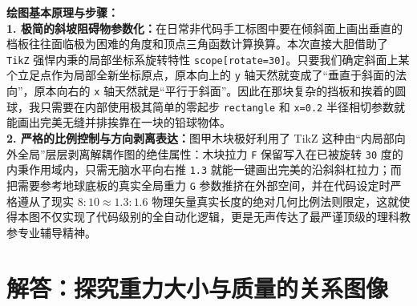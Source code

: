 \documentclass[12pt, a4paper]{ctexrep}
\begin{document}
{\small\color{blue!70!black}
\textbf{绘图基本原理与步骤：}\\
\textbf{1. 极简的斜坡阻碍物参数化：}在日常非代码手工标图中要在倾斜面上画出垂直的档板往往面临极为困难的角度和顶点三角函数计算换算。本次直接大胆借助了 \texttt{TikZ} 强悍内秉的局部坐标系旋转特性 \texttt{scope[rotate=30]}。只要我们确定斜面上某个立足点作为局部全新坐标原点，原本向上的 \texttt{y} 轴天然就变成了“垂直于斜面的法向”，原本向右的 \texttt{x} 轴天然就是“平行于斜面”。因此在那块复杂的挡板和挨着的圆球，我只需要在内部使用极其简单的零起步 \texttt{rectangle} 和 \texttt{x=0.2} 半径相切参数就能画出完美无缝并排挨靠在一块的铅球物体。\\
\textbf{2. 严格的比例控制与方向剥离表达：}图甲木块极好利用了 TikZ 这种由“内局部向外全局”层层剥离解耦作图的绝佳属性：木块拉力 \texttt{F} 保留写入在已被旋转 \texttt{30} 度的内秉作用域内，只需无脑水平向右推 \texttt{1.3} 就能一键画出完美的沿斜斜杠拉力；而把需要参考地球底板的真实全局重力 \texttt{G} 参数推挤在外部空间，并在代码设定时严格遵从了现实 $8:10 \approx 1.3:1.6$ 物理矢量真实长度的绝对几何比例法则限定，这就使得本图不仅实现了代码级别的全自动化逻辑，更是无声传达了最严谨顶级的理科教参专业辅导精神。
}


\section{解答：探究重力大小与质量的关系图像}

\vspace{0.6cm}
\end{document}
